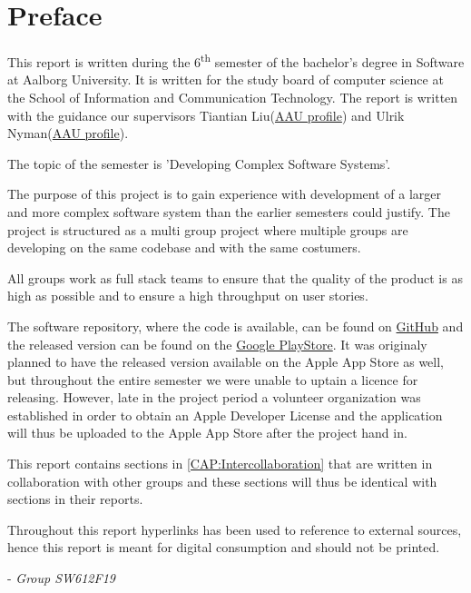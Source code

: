 \chapter*{Preface}
This report is written during the 6\textsuperscript{th} semester of the bachelor's degree in Software at Aalborg University.
It is written for the study board of computer science at the School of Information and Communication Technology.
The report is written with the guidance our supervisors Tiantian Liu(\href{http://personprofil.aau.dk/profil/145323}{AAU profile}) and Ulrik Nyman(\href{http://personprofil.aau.dk/profil/110550}{AAU profile}).

The topic of the semester is 'Developing Complex Software Systems'.

The purpose of this project is to gain experience with development of a larger and more complex software system than the earlier semesters could justify.
The project is structured as a multi group project where multiple groups are developing on the same codebase and with the same costumers.

All groups work as full stack teams to ensure that the quality of the product is as high as possible and to ensure a high throughput on user stories.

The software repository, where the code is available, can be found on \href{https://github.com/aau-giraf/}{GitHub} and the released version can be found on the \href{https://play.google.com/store/apps/details?id=dk.aau.cs.giraf.weekplanner}{Google PlayStore}.
It was originaly planned to have the released version available on the Apple App Store as well, but throughout the entire semester we were unable to uptain a licence for releasing.
However, late in the project period a volunteer organization was established in order to obtain an Apple Developer License and the application will thus be uploaded to the Apple App Store after the project hand in.

This report contains sections in \autoref{CAP:Intercollaboration} that are written in collaboration with other groups and these sections will thus be identical with sections in their reports.

Throughout this report hyperlinks has been used to reference to external sources, hence this report is meant for digital consumption and should not be printed. 

- \textit{Group SW612F19}

\newpage
